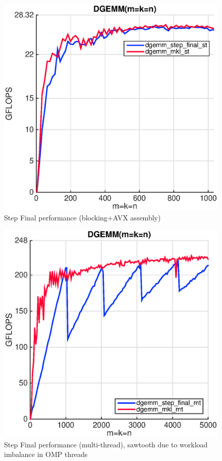 \begin{figure}[!htp]
  \centering
  \includegraphics[scale=.5]{figures/step_final_single_thread_ivy.eps}
  \caption{Step Final performance (blocking+AVX assembly)}
  \label{fig:final}
\end{figure} 

\begin{figure}[!htp]
  \centering
  \includegraphics[scale=.5]{figures/step_final_multi_thread_ivy.eps}
  \caption{Step Final performance (multi-thread), sawtooth due to workload imbalance
in OMP threads}
  \label{fig:final_mt}
\end{figure} 




